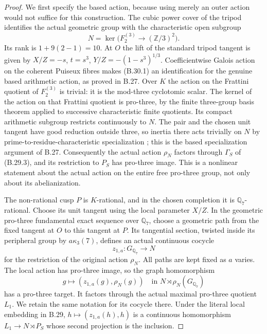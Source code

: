 \begin{proof}
We first specify the based action, because using merely an
outer action would not suffice for this construction.
The cubic power cover of the tripod identifies the actual
geometric group with the characteristic open subgroup
\[
        N=\ker\bigl(F_2^{(3)}\longrightarrow(\mathbb Z/3)^2\bigr).
                                                               \tag{B.30.1}
\]
Its rank is $1+9(2-1)=10$.
At $O$ the lift of the standard tripod tangent is given by
$X/Z=-s$, $t=s^3$, $Y/Z=-(1-s^3)^{1/3}$.
Coefficientwise Galois action on the coherent Puiseux fibres
makes (B.30.1) an identification for the genuine based
arithmetic action, as proved in B.27.
Over $K$ the action on the Frattini quotient of $F_2^{(3)}$
is trivial: it is the mod-three cyclotomic scalar.
The kernel of the action on that Frattini quotient is pro-three,
by the finite three-group basis theorem applied to successive
characteristic finite quotients.
Its compact arithmetic subgroup restricts continuously to $N$.
The pair and the chosen unit tangent have good reduction
outside three, so inertia there acts trivially on $N$ by
prime-to-residue-characteristic specialization
\citep[XIII, Corollary 2.12]{BSGA1}; this is the based
specialization argument of B.27.
Consequently the actual action $\rho_N$ factors through
$\Gamma_S$ of (B.29.3), and its restriction to $P_S$ has
pro-three image.  This is a nonlinear statement about the
actual action on the entire free pro-three group, not only
about its abelianization.

The non-rational cusp $P$ is $K$-rational, and in the chosen
completion it is $\mathbb Q_7$-rational.  Choose its unit
tangent using the local parameter $X/Z$.
In the geometric pro-three fundamental exact sequence over
$\mathbb Q_7$, choose a geometric path from the fixed tangent
at $O$ to this tangent at $P$.  Its tangential section,
twisted inside its peripheral group by $a\kappa_3(7)$,
defines an actual continuous cocycle
\[
                z_{1,a}:G_{\mathbb Q_7}\longrightarrow N
\]
for the restriction of the original action $\rho_N$.
All paths are kept fixed as $a$ varies.  The local action has
pro-three image, so the graph homomorphism
\[
 g\longmapsto(z_{1,a}(g),\rho_N(g))
       \quad\text{in }N\rtimes\rho_N(G_{\mathbb Q_7})
                                                               \tag{B.30.2}
\]
has a pro-three target.  It factors through the actual maximal
pro-three quotient $L_1$.  We retain the same notation for its
cocycle there.  Under the literal local embedding in B.29,
$h\mapsto(z_{1,a}(h),h)$ is a continuous homomorphism
$L_1\to N\rtimes P_S$ whose second projection is the inclusion.


\end{proof}
